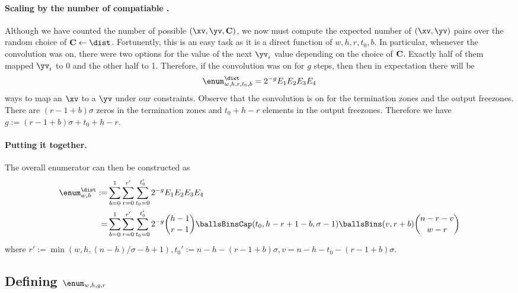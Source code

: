 \paragraph{Scaling by the number of compatiable \C.} Although we have counted the number of possible $(\xv,\yv,\C)$, we now must compute the expected number of $(\xv,\yv)$ pairs over the random choice of $\C\gets \dist$. Fortunently, this is an easy task as it is a direct function of $w,h,r,t_0,b$. In particular, whenever the convolution was on, there were two options for the value of the next $\yv_i$ value depending on the choice of $\mathbf C$. Exactly half of them mapped $\yv_i$ to 0 and the other half to 1. Therefore, if the convolution was on for $g$ steps, then then in expectation there will be
$$
\enum^\dist_{w,h,r,t_0,b}=2^{-g}E_1E_2E_3E_4
$$
ways to map an $\xv$ to a $\yv$ under our constraints. Observe that the convolution is on for the termination zones and the output freezones. There are $(r-1+b)\sigma$ zeros in the termination zones and $t_0+h-r$ elements in the output freezones. Therefore we have $g:=(r-1+b)\sigma+t_0+h-r$.


\paragraph{Putting it together.}
The overall enumerator can then be constructed as
\begin{align*}
    \enum^\dist_{w,h} :=&\sum_{b=0}^1 \sum_{r=0}^{r'} \sum_{t_0=0}^{t_0'}2^{-g}E_1E_2E_3E_4\\
    =&\sum_{b=0}^1 \sum_{r=0}^{r'} \sum_{t_0=0}^{t_0'}2^{-g}\binom{h-1}{r-1}\ballsBinsCap(t_0, h-r + 1-b, \sigma-1)\ballsBins(v,r+b)\binom{n-r-v}{w-r}
\end{align*}
where $r':=\min(w,h,(n-h)/\sigma -b+1),t_0':=n-h-(r-1+b)\sigma, v=n-h-t_0-(r-1+b)\sigma$.






\fi






\iffalse


\subsection{Defining $\enum_{w,h,g,r}$}

